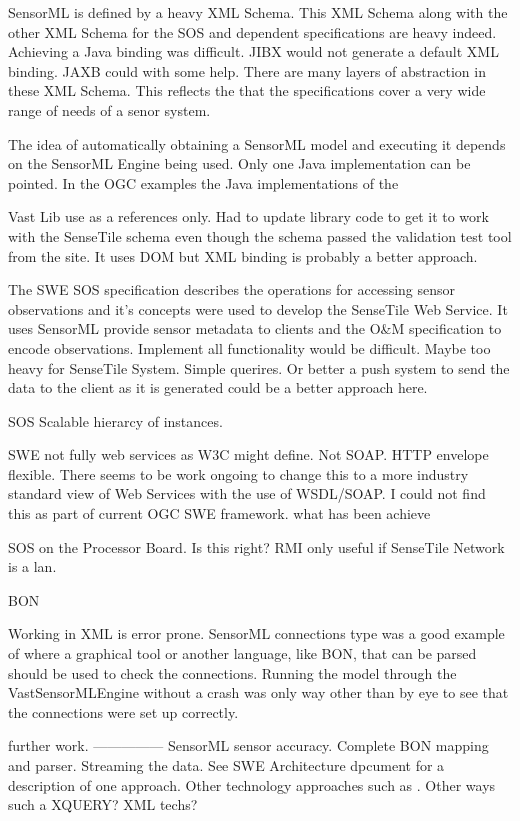 \documentclass[]{final_report}
\begin{document}
SensorML is defined by a heavy XML Schema. This XML Schema along with the other XML Schema for the SOS and dependent specifications are heavy indeed. Achieving a Java binding was difficult. JIBX would not generate a default XML binding. JAXB could with some help. There are many layers of abstraction in these XML Schema. This reflects the that the specifications cover a very wide range of needs of a senor system.

The idea of automatically obtaining a SensorML model and executing it depends on the SensorML Engine being used. Only one Java implementation can be pointed. In the OGC examples the Java implementations of the 

Vast Lib use as a references only.
Had to update library code to get it to work with the SenseTile schema even though the schema
passed the validation test tool from the site. It uses DOM but XML binding is probably a better approach.

The SWE SOS specification describes the operations for accessing sensor observations and it's concepts were used to develop the SenseTile Web Service. It uses SensorML provide sensor metadata to clients and the O\&M specification to encode observations.
Implement all functionality would be difficult. Maybe too heavy for SenseTile System. Simple querires. Or better a push system to send the data to the client as it is generated could be a better approach here.

SOS Scalable hierarcy of instances.

SWE not fully web services as W3C might define. Not SOAP. HTTP envelope
flexible. There seems to be work ongoing to change this to a more industry standard view of Web Services with the use of WSDL/SOAP. I could not find this as part of current OGC SWE framework.
what has been achieve

SOS on the Processor Board. Is this right? RMI only useful if SenseTile Network is a lan.

BON

Working in XML is error prone. SensorML connections type was a good example of where a graphical tool or another language, like BON,  that can be parsed should be used to check the connections. Running the model through the VastSensorMLEngine without a crash was only way other than by eye to see that the connections were set up correctly. 


further work.
---------------
SensorML sensor accuracy.
Complete BON mapping and parser.
Streaming the data. See SWE Architecture dpcument for a description of one approach.
Other technology approaches such as . Other ways such a XQUERY? XML techs?
\end{document}
